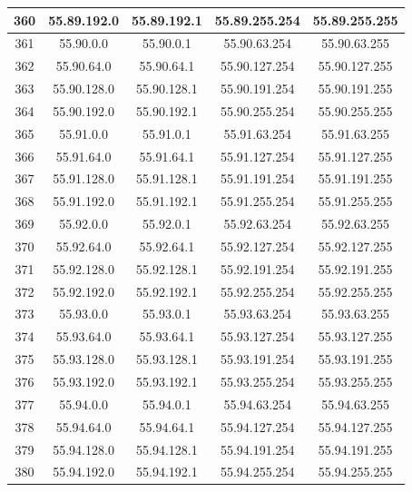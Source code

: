 \documentclass[letterpaper,12pt]{article}
\begin{document}
\begin{center}
\begin{longtable}{|c|c|c|c|c|}
                360 & 55.89.192.0 & 55.89.192.1 & 55.89.255.254 & 55.89.255.255 \\ \hline
                361 & 55.90.0.0 & 55.90.0.1 & 55.90.63.254 & 55.90.63.255 \\ \hline
                362 & 55.90.64.0 & 55.90.64.1 & 55.90.127.254 & 55.90.127.255 \\ \hline
                363 & 55.90.128.0 & 55.90.128.1 & 55.90.191.254 & 55.90.191.255 \\ \hline
                364 & 55.90.192.0 & 55.90.192.1 & 55.90.255.254 & 55.90.255.255 \\ \hline
                365 & 55.91.0.0 & 55.91.0.1 & 55.91.63.254 & 55.91.63.255 \\ \hline
                366 & 55.91.64.0 & 55.91.64.1 & 55.91.127.254 & 55.91.127.255 \\ \hline
                367 & 55.91.128.0 & 55.91.128.1 & 55.91.191.254 & 55.91.191.255 \\ \hline
                368 & 55.91.192.0 & 55.91.192.1 & 55.91.255.254 & 55.91.255.255 \\ \hline
                369 & 55.92.0.0 & 55.92.0.1 & 55.92.63.254 & 55.92.63.255 \\ \hline
                370 & 55.92.64.0 & 55.92.64.1 & 55.92.127.254 & 55.92.127.255 \\ \hline
                371 & 55.92.128.0 & 55.92.128.1 & 55.92.191.254 & 55.92.191.255 \\ \hline
                372 & 55.92.192.0 & 55.92.192.1 & 55.92.255.254 & 55.92.255.255 \\ \hline
                373 & 55.93.0.0 & 55.93.0.1 & 55.93.63.254 & 55.93.63.255 \\ \hline
                374 & 55.93.64.0 & 55.93.64.1 & 55.93.127.254 & 55.93.127.255 \\ \hline
                375 & 55.93.128.0 & 55.93.128.1 & 55.93.191.254 & 55.93.191.255 \\ \hline
                376 & 55.93.192.0 & 55.93.192.1 & 55.93.255.254 & 55.93.255.255 \\ \hline
                377 & 55.94.0.0 & 55.94.0.1 & 55.94.63.254 & 55.94.63.255 \\ \hline
                378 & 55.94.64.0 & 55.94.64.1 & 55.94.127.254 & 55.94.127.255 \\ \hline
                379 & 55.94.128.0 & 55.94.128.1 & 55.94.191.254 & 55.94.191.255 \\ \hline
                380 & 55.94.192.0 & 55.94.192.1 & 55.94.255.254 & 55.94.255.255 \\ \hline

\end{longtable}
\end{center}
\end{document}
